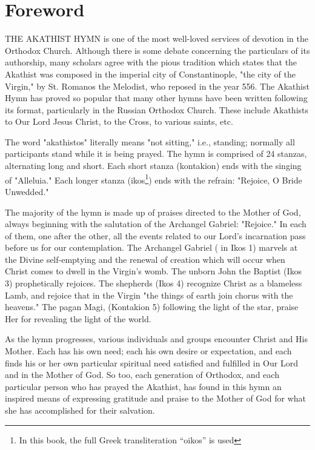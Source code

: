 \begingroup
\let\clearpage\relax
\let\cleardoublepage\relax
\let\cleardoublepage\relax

\chapter*{Foreword}
THE AKATHIST HYMN is one of the most well-loved services of devotion in the Orthodox Church. Although there is some debate concerning the particulars of its authorship, many scholars agree with the pious tradition which states that the Akathist was composed in the imperial city of Constantinople, "the city of the Virgin," by St. Romanos the Melodist, who reposed in the year 556. The Akathist Hymn has proved so popular that many other hymns have been written following its format, particularly in the Russian Orthodox Church. These include Akathists to Our Lord Jesus Christ, to the Cross, to various saints, etc.

The word "akathistos" literally means "not sitting," i.e., standing; normally all participants stand while it is being prayed. The hymn is comprised of 24 stanzas, alternating long and short. Each short stanza (kontakion) ends with the singing of "Alleluia." Each longer stanza (ikos\footnote{In this book, the full Greek transliteration ``oikos'' is used}) ends with the refrain: "Rejoice, O Bride Unwedded."

The majority of the hymn is made up of praises directed to the Mother of God, always beginning with the salutation of the Archangel Gabriel: "Rejoice." In each of them, one after the other, all the events related to our Lord's incarnation pass before us for our contemplation. The Archangel Gabriel ( in Ikos 1) marvels at the Divine self-emptying and the renewal of creation which will occur when Christ comes to dwell in the Virgin's womb. The unborn John the Baptist (Ikos 3) prophetically rejoices. The shepherds (Ikos 4) recognize Christ as a blameless Lamb, and rejoice that in the Virgin "the things of earth join chorus with the heavens." The pagan Magi, (Kontakion 5) following the light of the star, praise Her for revealing the light of the world.

As the hymn progresses, various individuals and groups encounter Christ and His Mother. Each has his own need; each his own desire or expectation, and each finds his or her own particular spiritual need satisfied and fulfilled in Our Lord and in the Mother of God. So too, each generation of Orthodox, and each particular person who has prayed the Akathist, has found in this hymn an inspired means of expressing gratitude and praise to the Mother of God for what she has accomplished for their salvation.

